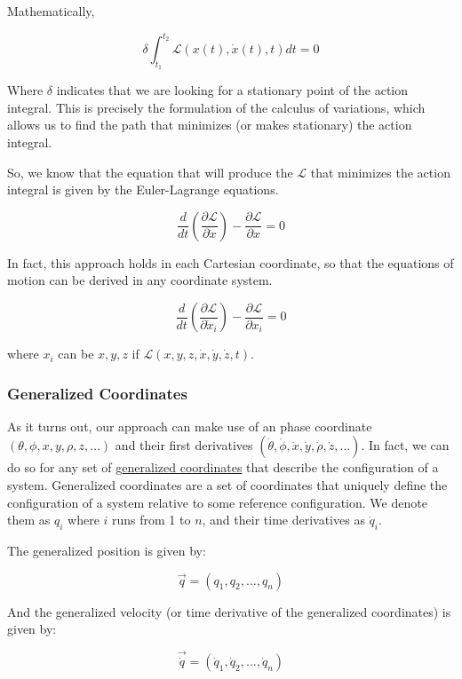 \documentclass[11pt]{article}
\begin{document}
Mathematically,

\[\delta \int_{t_1}^{t_2} \mathcal{L}(x(t), \dot{x}(t), t) dt = 0\]

Where \(\delta\) indicates that we are looking for a stationary point of
the action integral. This is precisely the formulation of the calculus
of variations, which allows us to find the path that minimizes (or makes
stationary) the action integral.

So, we know that the equation that will produce the \(\mathcal{L}\) that
minimizes the action integral is given by the Euler-Lagrange equations.

\[\frac{d}{dt} \left( \frac{\partial \mathcal{L}}{\partial \dot{x}} \right) - \frac{\partial \mathcal{L}}{\partial x} = 0\]

In fact, this approach holds in each Cartesian coordinate, so that the
equations of motion can be derived in any coordinate system.

\[\frac{d}{dt} \left( \frac{\partial \mathcal{L}}{\partial \dot{x}_i} \right) - \frac{\partial \mathcal{L}}{\partial x_i} = 0\]

where \(x_i\) can be \(x, y, z\) if
\(\mathcal{L}(x,y,z,\dot{x},\dot{y},\dot{z},t)\).

    \subsubsection{Generalized Coordinates}\label{generalized-coordinates}

As it turns out, our approach can make use of an phase coordinate
\((\theta, \phi, x, y, \rho, z, \ldots)\) and their first derivatives
\((\dot{\theta}, \dot{\phi}, \dot{x}, \dot{y}, \dot{\rho}, \dot{z}, \ldots)\).
In fact, we can do so for any set of
\href{https://en.wikipedia.org/wiki/Generalized_coordinates}{generalized
coordinates} that describe the configuration of a system. Generalized
coordinates are a set of coordinates that uniquely define the
configuration of a system relative to some reference configuration. We
denote them as \(q_i\) where \(i\) runs from 1 to \(n\), and their time
derivatives as \(\dot{q}_i\).

The generalized position is given by:

\[\vec{q} = (q_1, q_2, \ldots, q_n)\]

And the generalized velocity (or time derivative of the generalized
coordinates) is given by:

\[\vec{\dot{q}} = \left(\dot{q}_1, \dot{q}_2, \ldots, \dot{q}_n\right)\]
\end{document}
